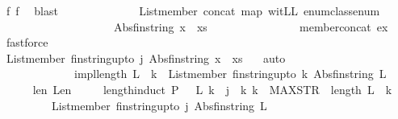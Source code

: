 \begin{isabellebody}
\ f{}\ f{}\ \isamarkupfalse%
\ blast\isanewline
\ \ \ \ \ \ \ \ \ \ \ \ \isamarkupfalse%
\ {\isachardoublequoteopen}List{\isachardot}member\ {\isacharparenleft}concat\ {\isacharparenleft}map\ {\isacharquery}witLL\ enum{\isacharunderscore}class{\isachardot}enum{\isacharparenright}{\isacharparenright}\isanewline
\ \ \ \ \ \ \ \ \ \ \ \ \ \ \ \ \ \ \ \ {\isacharparenleft}Abs{\isacharunderscore}fin{\isacharunderscore}string\ {\isacharparenleft}x\ {\isacharhash}\ xs{\isacharparenright}{\isacharparenright}{\isachardoublequoteclose}\isanewline
\ \ \ \ \ \ \ \ \ \ \ \ \ \ \isamarkupfalse%
\ member{\isacharunderscore}concat\ ex\ \isamarkupfalse%
\ fastforce\isanewline
\ \ \ \ \ \ \ \ \ \ \isamarkupfalse%
\isanewline
\ \ \ \ \ \ \ \ \ \ \isamarkupfalse%
\ \isamarkupfalse%
\ {\isachardoublequoteopen}List{\isachardot}member\ {\isacharparenleft}fin{\isacharunderscore}string{\isacharunderscore}upto\ j{\isacharparenright}\ {\isacharparenleft}Abs{\isacharunderscore}fin{\isacharunderscore}string\ {\isacharparenleft}x\ {\isacharhash}\ xs{\isacharparenright}{\isacharparenright}{\isachardoublequoteclose}\ \ \isamarkupfalse%
\ auto\isanewline
\ \ \ \ \ \ \ \ \isamarkupfalse%
\isanewline
\ \ \ \ \ \ \ \ \isamarkupfalse%
\isanewline
\ \ \ \ \isamarkupfalse%
\isanewline
\ \ \ \ \isamarkupfalse%
\isanewline
\ \ \isamarkupfalse%
\ impl{\isacharcolon}{\isachardoublequoteopen}length\ L\ {\isasymle}\ k\ {\isasymLongrightarrow}\ List{\isachardot}member\ {\isacharparenleft}fin{\isacharunderscore}string{\isacharunderscore}upto\ k{\isacharparenright}\ {\isacharparenleft}Abs{\isacharunderscore}fin{\isacharunderscore}string\ L{\isacharparenright}{\isachardoublequoteclose}\isanewline
\ \ \ \ \isamarkupfalse%
\ len\ Len\ \isanewline
\ \ \ \ length{\isacharunderscore}induct{\isacharbrackleft}\ P\ {\isacharequal}\ {\isachardoublequoteopen}{\isacharparenleft}{\isasymlambda}\ L\ k{\isachardot}\ {\isasymforall}\ j\ {\isasymge}\ k{\isachardot}\ k\ {\isasymle}\ MAX{\isacharunderscore}STR\ {\isasymlongrightarrow}\ length\ L\ {\isacharequal}\ k\ \isanewline
\ \ \ \ \ \ \ \ {\isasymlongrightarrow}\ List{\isachardot}member\ {\isacharparenleft}fin{\isacharunderscore}string{\isacharunderscore}upto\ j{\isacharparenright}\ {\isacharparenleft}Abs{\isacharunderscore}fin{\isacharunderscore}string\ L{\isacharparenright}{\isacharparenright}{\isachardoublequoteclose}\isanewline

\end{isabellebody}
